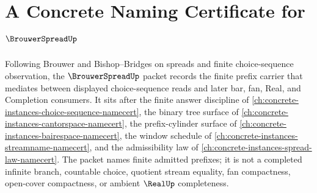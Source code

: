 \chapter{A Concrete Naming Certificate for $\BrouwerSpreadUp$}
\label{ch:concrete-instances-brouwer-spread-namecert}

Following Brouwer and Bishop--Bridges on spreads and finite choice-sequence observation, the $\BrouwerSpreadUp$ packet records the finite prefix carrier that mediates between displayed choice-sequence reads and later bar, fan, Real, and Completion consumers. It sits after the finite answer discipline of \autoref{ch:concrete-instances-choice-sequence-namecert}, the binary tree surface of \autoref{ch:concrete-instances-cantorspace-namecert}, the prefix-cylinder surface of \autoref{ch:concrete-instances-bairespace-namecert}, the window schedule of \autoref{ch:concrete-instances-streamname-namecert}, and the admissibility law of \autoref{ch:concrete-instances-spread-law-namecert}. The packet names finite admitted prefixes; it is not a completed infinite branch, countable choice, quotient stream equality, fan compactness, open-cover compactness, or ambient $\RealUp$ completeness.

